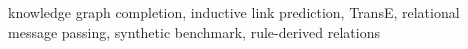 knowledge graph completion, inductive link prediction, TransE, relational message passing, synthetic benchmark, rule-derived relations
